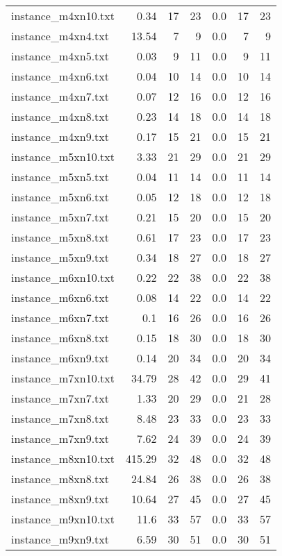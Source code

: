 \documentclass{article}
\begin{document}
\begin{center}
\begin{tabular}{lrrrrrr}
instance\_m4xn10.txt & 0.34 & 17 & 23
 & 0.0 & 17 & 23
\\
instance\_m4xn4.txt & 13.54 & 7 & 9
 & 0.0 & 7 & 9
\\
instance\_m4xn5.txt & 0.03 & 9 & 11
 & 0.0 & 9 & 11
\\
instance\_m4xn6.txt & 0.04 & 10 & 14
 & 0.0 & 10 & 14
\\
instance\_m4xn7.txt & 0.07 & 12 & 16
 & 0.0 & 12 & 16
\\
instance\_m4xn8.txt & 0.23 & 14 & 18
 & 0.0 & 14 & 18
\\
instance\_m4xn9.txt & 0.17 & 15 & 21
 & 0.0 & 15 & 21
\\
instance\_m5xn10.txt & 3.33 & 21 & 29
 & 0.0 & 21 & 29
\\
instance\_m5xn5.txt & 0.04 & 11 & 14
 & 0.0 & 11 & 14
\\
instance\_m5xn6.txt & 0.05 & 12 & 18
 & 0.0 & 12 & 18
\\
instance\_m5xn7.txt & 0.21 & 15 & 20
 & 0.0 & 15 & 20
\\
instance\_m5xn8.txt & 0.61 & 17 & 23
 & 0.0 & 17 & 23
\\
instance\_m5xn9.txt & 0.34 & 18 & 27
 & 0.0 & 18 & 27
\\
instance\_m6xn10.txt & 0.22 & 22 & 38
 & 0.0 & 22 & 38
\\
instance\_m6xn6.txt & 0.08 & 14 & 22
 & 0.0 & 14 & 22
\\
instance\_m6xn7.txt & 0.1 & 16 & 26
 & 0.0 & 16 & 26
\\
instance\_m6xn8.txt & 0.15 & 18 & 30
 & 0.0 & 18 & 30
\\
instance\_m6xn9.txt & 0.14 & 20 & 34
 & 0.0 & 20 & 34
\\
instance\_m7xn10.txt & 34.79 & 28 & 42
 & 0.0 & 29 & 41
\\
instance\_m7xn7.txt & 1.33 & 20 & 29
 & 0.0 & 21 & 28
\\
instance\_m7xn8.txt & 8.48 & 23 & 33
 & 0.0 & 23 & 33
\\
instance\_m7xn9.txt & 7.62 & 24 & 39
 & 0.0 & 24 & 39
\\
instance\_m8xn10.txt & 415.29 & 32 & 48
 & 0.0 & 32 & 48
\\
instance\_m8xn8.txt & 24.84 & 26 & 38
 & 0.0 & 26 & 38
\\
instance\_m8xn9.txt & 10.64 & 27 & 45
 & 0.0 & 27 & 45
\\
instance\_m9xn10.txt & 11.6 & 33 & 57
 & 0.0 & 33 & 57
\\
instance\_m9xn9.txt & 6.59 & 30 & 51
 & 0.0 & 30 & 51
\\
\hline\end{tabular}
\end{center}
\end{document}
